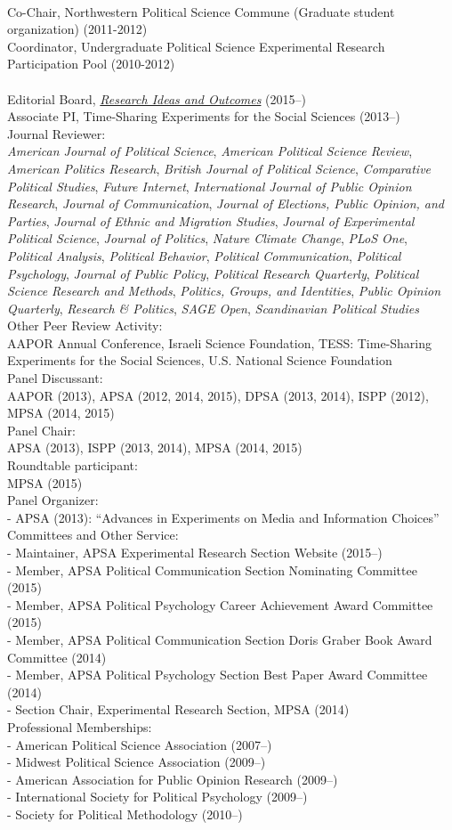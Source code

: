 \documentclass[12pt]{article}
\newcommand{\topic}[1]{\pagebreak[3]\indent {\color{lg}{\footnotesize #1 }}\\}
\newcommand{\entry}[1]{\indent {\color{lg}\guillemotright}\hspace{2pt}#1\vspace{.25em}\\}
\newcommand{\subentry}[1]{{\color{lg}-} #1\vspace{.25em}\\}
\begin{document}
\topic{Departmental (Northwestern University)}
\entry{Co-Chair, Northwestern Political Science Commune (Graduate student organization) (2011-2012)}
\entry{Coordinator, Undergraduate Political Science Experimental Research Participation Pool (2010-2012)}

\topic{Disciplinary}
\entry{Editorial Board, \href{http://riojournal.com/}{{\em Research Ideas and Outcomes}} (2015--)}
\entry{Associate PI, Time-Sharing Experiments for the Social Sciences (2013--)}
\entry{Journal Reviewer:\\{\em American Journal of Political Science}, {\em American Political Science Review}, {\em American Politics Research}, {\em British Journal of Political Science}, {\em Comparative Political Studies}, {\em Future Internet}, {\em International Journal of Public Opinion Research}, {\em Journal of Communication}, {\em Journal of Elections, Public Opinion, and Parties}, {\em Journal of Ethnic and Migration Studies}, {\em Journal of Experimental Political Science}, {\em Journal of Politics}, {\em Nature Climate Change}, {\em PLoS One}, {\em Political Analysis}, {\em Political Behavior}, {\em Political Communication}, {\em Political Psychology}, {\em Journal of Public Policy}, {\em Political Research Quarterly}, {\em Political Science Research and Methods}, {\em Politics, Groups, and Identities}, {\em Public Opinion Quarterly}, {\em Research \& Politics}, {\em SAGE Open}, {\em Scandinavian Political Studies}}
\entry{Other Peer Review Activity:\\ AAPOR Annual Conference, Israeli Science Foundation, TESS: Time-Sharing Experiments for the Social Sciences, U.S. National Science Foundation}
\entry{Panel Discussant:\\ AAPOR (2013), APSA (2012, 2014, 2015), DPSA (2013, 2014), ISPP (2012), MPSA (2014, 2015)}
\entry{Panel Chair:\\ APSA (2013), ISPP (2013, 2014), MPSA (2014, 2015)}
\entry{Roundtable participant:\\ MPSA (2015)}
\entry{Panel Organizer:}
\subentry{APSA (2013): ``Advances in Experiments on Media and Information Choices''}
\entry{Committees and Other Service:}
\subentry{Maintainer, APSA Experimental Research Section Website (2015--)}
\subentry{Member, APSA Political Communication Section Nominating Committee (2015)}
\subentry{Member, APSA Political Psychology Career Achievement Award Committee (2015)}
\subentry{Member, APSA Political Communication Section Doris Graber Book Award Committee (2014)}
\subentry{Member, APSA Political Psychology Section Best Paper Award Committee (2014)}
\subentry{Section Chair, Experimental Research Section, MPSA (2014)}
\entry{Professional Memberships:}
\subentry{American Political Science Association (2007--)}
\subentry{Midwest Political Science Association (2009--)}
\subentry{American Association for Public Opinion Research (2009--)}
\subentry{International Society for Political Psychology (2009--)}
\subentry{Society for Political Methodology (2010--)}
\end{document}
